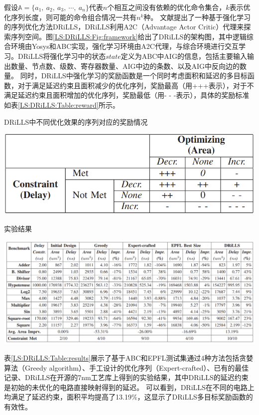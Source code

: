 假设$\mathbb{A} = \{ a_1,\ a_2,\ a_3,\ \cdots,\ a_n \}$代表$n$个相互之间没有依赖的优化命令集合，$k$表示优化序列长度，则可能的命令组合情况一共有$n^k$种。
文献\cite{LS:DRiLLS}提出了一种基于强化学习的序列优化方法DRiLLS，DRiLLS利用A2C（Advantage Actor Critic）代理来探索序列空间。图\ref{LS:DRiLLS:Fig:framework}给出了DRiLLS的架构图，其中逻辑综合环境由Yosys和ABC实现，强化学习环境由A2C代理，与综合环境进行交互学习。DRiLLS将强化学习中的状态$state$定义为ABC中AIG的信息，包括主要输入输出数量、节点数、级数、寄存器数量、AIG中边的条数、以及AIG中反向边的数量。
同时，DRiLLS中强化学习的奖励函数是一个同时考虑面积和延迟的多目标函数，对于满足延迟约束且面积减少的优化序列，奖励最高（用+++表示），对于不满足延迟约束且面积增加的优化序列，奖励最低（用- - -表示），具体的奖励标准如表\ref{LS:DRiLLS:Table:reward}所示。

\begin{table}[!htbp]
    \caption{DRiLLS中不同优化效果的序列对应的奖励情况}
    \centering
    \label{LS:DRiLLS:Table:reward}
    \includegraphics[width=0.7\linewidth]{./figs/LS-DRiLLS-reward_table.png}
\end{table}

\begin{table}[!htbp]
    \caption{实验结果}
    \centering
    \label{LS:DRiLLS:Table:results}
    \includegraphics[width=\linewidth]{./figs/LS-DRiLLS-results.png}
\end{table}

表\ref{LS:DRiLLS:Table:results}展示了基于ABC\cite{LS:ABC}和EPFL测试集\cite{LS:EPFL_benchs_iwls,LS:EPFL_benchs_github}通过4种方法包括贪婪算法（Greedy algorithm）、手工设计的优化序列\cite{LS:DRiLLS:hand_craft}（Expert-crafted）、已有的最佳记录、DRiLLS在开源的7nm工艺库\cite{ASAP7_github}上得到的实验结果，其中DRiLLS的延迟约束是初始的未优化的电路直接映射得到的延迟。
可以看到，DRiLLS在不同的电路上均满足了延迟约束，面积平均提高了13.19\%，这显示了DRiLLS多目标奖励函数的有效性。


